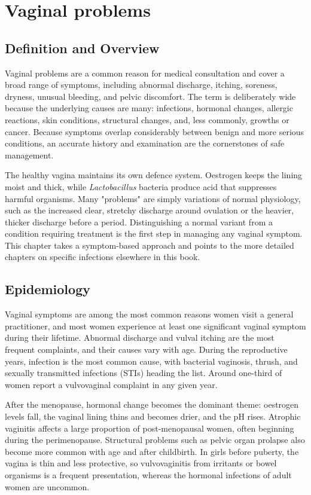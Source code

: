 \chapter{Vaginal problems}

\section*{Definition and Overview}
Vaginal problems are a common reason for medical consultation and cover a broad range of symptoms, including abnormal discharge, itching, soreness, dryness, unusual bleeding, and pelvic discomfort. The term is deliberately wide because the underlying causes are many: infections, hormonal changes, allergic reactions, skin conditions, structural changes, and, less commonly, growths or cancer. Because symptoms overlap considerably between benign and more serious conditions, an accurate history and examination are the cornerstones of safe management.

The healthy vagina maintains its own defence system. Oestrogen keeps the lining moist and thick, while \textit{Lactobacillus} bacteria produce acid that suppresses harmful organisms. Many "problems" are simply variations of normal physiology, such as the increased clear, stretchy discharge around ovulation or the heavier, thicker discharge before a period. Distinguishing a normal variant from a condition requiring treatment is the first step in managing any vaginal symptom. This chapter takes a symptom-based approach and points to the more detailed chapters on specific infections elsewhere in this book.

\section*{Epidemiology}
Vaginal symptoms are among the most common reasons women visit a general practitioner, and most women experience at least one significant vaginal symptom during their lifetime. Abnormal discharge and vulval itching are the most frequent complaints, and their causes vary with age. During the reproductive years, infection is the most common cause, with bacterial vaginosis, thrush, and sexually transmitted infections (STIs) heading the list. Around one-third of women report a vulvovaginal complaint in any given year.

After the menopause, hormonal change becomes the dominant theme: oestrogen levels fall, the vaginal lining thins and becomes drier, and the pH rises. Atrophic vaginitis affects a large proportion of post-menopausal women, often beginning during the perimenopause. Structural problems such as pelvic organ prolapse also become more common with age and after childbirth. In girls before puberty, the vagina is thin and less protective, so vulvovaginitis from irritants or bowel organisms is a frequent presentation, whereas the hormonal infections of adult women are uncommon.

